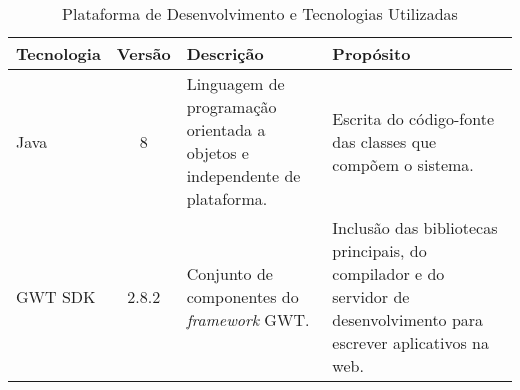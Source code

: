 \begin{table}[h]
	\centering	
	\vspace{0.5cm}
	\footnotesize
	\caption{Plataforma de Desenvolvimento e Tecnologias Utilizadas}	
	\label{tabela-plataforma}
	\begin{tabular}{|p{1.6cm}|c|p{5cm}|p{6.5cm}|}  \hline 
 		
 		\rowcolor[rgb]{0.8,0.8,0.8} Tecnologia & Versão & Descrição & Propósito \\\hline 
 		

		Java & 8 & Linguagem de programação orientada a objetos e independente de plataforma. & Escrita do código-fonte das classes que compõem o sistema. \\\hline
		
		
		
		
		
		GWT SDK & 2.8.2 &  Conjunto de componentes do \textit{framework} GWT. & Inclusão das bibliotecas principais, do compilador e do servidor de desenvolvimento para escrever aplicativos na web. \\\hline
		
		

\end{tabular}
\end{table}
